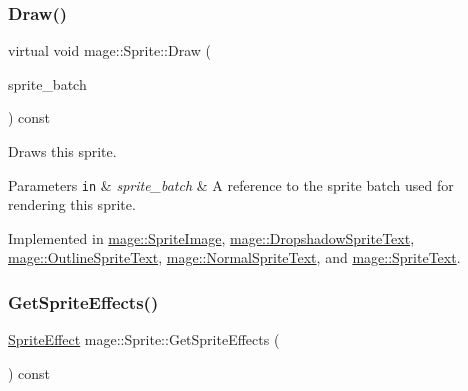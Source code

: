 \hypertarget{classmage_1_1_sprite_a954a9f2046edcd6b1658a236ae23ec5a}{}\label{classmage_1_1_sprite_a954a9f2046edcd6b1658a236ae23ec5a} 
\subsubsection{\texorpdfstring{Draw()}{Draw()}}
{\footnotesize\ttfamily virtual void mage\+::\+Sprite\+::\+Draw (\begin{DoxyParamCaption}\item[{Sprite\+Batch \&}]{sprite\+\_\+batch }\end{DoxyParamCaption}) const\hspace{0.3cm}{\ttfamily [pure virtual]}}

Draws this sprite.


\begin{DoxyParams}[1]{Parameters}
\mbox{\tt in}  & {\em sprite\+\_\+batch} & A reference to the sprite batch used for rendering this sprite. \\
\hline
\end{DoxyParams}


Implemented in \hyperlink{classmage_1_1_sprite_image_ae30d3293931f674fea17008063755bb6}{mage\+::\+Sprite\+Image}, \hyperlink{classmage_1_1_dropshadow_sprite_text_af76422c9812d7dc38e9b98e587103c67}{mage\+::\+Dropshadow\+Sprite\+Text}, \hyperlink{classmage_1_1_outline_sprite_text_a524e9ad1caeeeaa32405e61d1a5e1032}{mage\+::\+Outline\+Sprite\+Text}, \hyperlink{classmage_1_1_normal_sprite_text_ad2a1b02bea18afd6bf61b106a727a355}{mage\+::\+Normal\+Sprite\+Text}, and \hyperlink{classmage_1_1_sprite_text_a45d5ac8410d5a46b26e8491946a2ad9e}{mage\+::\+Sprite\+Text}.

\hypertarget{classmage_1_1_sprite_a1a969b7cf3f1892894710a80582b4cd2}{}\label{classmage_1_1_sprite_a1a969b7cf3f1892894710a80582b4cd2} 
\subsubsection{\texorpdfstring{Get\+Sprite\+Effects()}{GetSpriteEffects()}}
{\footnotesize\ttfamily \hyperlink{namespacemage_a9cfe18123066ba4236f548f9de75d881}{Sprite\+Effect} mage\+::\+Sprite\+::\+Get\+Sprite\+Effects (\begin{DoxyParamCaption}{ }\end{DoxyParamCaption}) const\hspace{0.3cm}{\ttfamily [noexcept]}}

